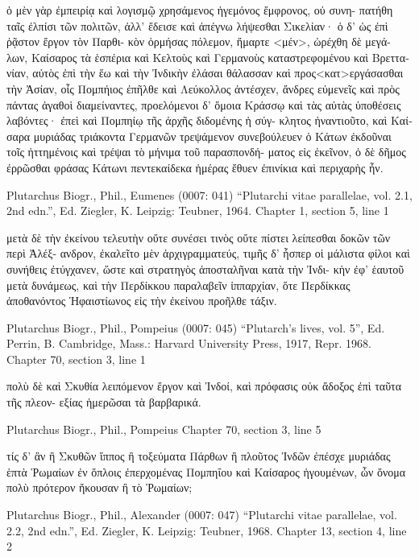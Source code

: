 \documentclass[12pt,letterpaper,twoside,final]{memoir}
\begin{document}
\begin{greek}
                                                ὁ μὲν γὰρ ἐμπειρίᾳ 
καὶ λογισμῷ χρησάμενος ἡγεμόνος ἔμφρονος, οὐ συνη-
πατήθη ταῖς ἐλπίσι τῶν πολιτῶν, ἀλλ' ἔδεισε καὶ ἀπέγνω 
λήψεσθαι Σικελίαν· ὁ δ' ὡς ἐπὶ ῥᾷστον ἔργον τὸν Παρθι-
κὸν ὁρμήσας πόλεμον, ἥμαρτε <μέν>, ὠρέχθη δὲ μεγά-
λων, Καίσαρος τὰ ἑσπέρια καὶ Κελτοὺς καὶ Γερμανοὺς 
καταστρεφομένου καὶ Βρεττανίαν, αὐτὸς ἐπὶ τὴν ἕω καὶ 
τὴν Ἰνδικὴν ἐλάσαι θάλασσαν καὶ προς<κατ>εργάσασθαι 
τὴν Ἀσίαν, οἷς Πομπήιος ἐπῆλθε καὶ Λεύκολλος ἀντέσχεν, 
ἄνδρες εὐμενεῖς καὶ πρὸς πάντας ἀγαθοὶ διαμείναντες, 
προελόμενοι δ' ὅμοια Κράσσῳ καὶ τὰς αὐτὰς ὑποθέσεις 
λαβόντες· ἐπεὶ καὶ Πομπηίῳ τῆς ἀρχῆς διδομένης ἡ σύγ-
κλητος ἠναντιοῦτο, καὶ Καίσαρα μυριάδας τριάκοντα 
Γερμανῶν τρεψάμενον συνεβούλευεν ὁ Κάτων ἐκδοῦναι 
τοῖς ἡττημένοις καὶ τρέψαι τὸ μήνιμα τοῦ παρασπονδή-
ματος εἰς ἐκεῖνον, ὁ δὲ δῆμος ἐρρῶσθαι φράσας Κάτωνι 
πεντεκαίδεκα ἡμέρας ἔθυεν ἐπινίκια καὶ περιχαρὴς ἦν. 



Plutarchus Biogr., Phil., Eumenes (0007: 041)
“Plutarchi vitae parallelae, vol. 2.1, 2nd edn.”, Ed. Ziegler, K.
Leipzig: Teubner, 1964.
Chapter 1, section 5, line 1

                                                            μετὰ δὲ τὴν ἐκείνου 
τελευτὴν οὔτε συνέσει τινὸς οὔτε πίστει λείπεσθαι δοκῶν τῶν περὶ Ἀλέξ-
ανδρον, ἐκαλεῖτο μὲν ἀρχιγραμματεύς, τιμῆς δ' ἧσπερ οἱ μάλιστα φίλοι 
καὶ συνήθεις ἐτύγχανεν, ὥστε καὶ στρατηγὸς ἀποσταλῆναι κατὰ τὴν Ἰνδι-
κὴν ἐφ' ἑαυτοῦ μετὰ δυνάμεως, καὶ τὴν Περδίκκου παραλαβεῖν ἱππαρχίαν, 
ὅτε Περδίκκας ἀποθανόντος Ἡφαιστίωνος εἰς τὴν ἐκείνου προῆλθε τάξιν. 



Plutarchus Biogr., Phil., Pompeius (0007: 045)
“Plutarch's lives, vol. 5”, Ed. Perrin, B.
Cambridge, Mass.: Harvard University Press, 1917, Repr. 1968.
Chapter 70, section 3, line 1

πολὺ δὲ καὶ Σκυθία λειπόμενον ἔργον καὶ Ἰνδοί, 
καὶ πρόφασις οὐκ ἄδοξος ἐπὶ ταῦτα τῆς πλεον-
εξίας ἡμερῶσαι τὰ βαρβαρικά. 



Plutarchus Biogr., Phil., Pompeius 
Chapter 70, section 3, line 5

                                  τίς δ' ἂν ἢ 
Σκυθῶν ἵππος ἢ τοξεύματα Πάρθων ἢ πλοῦτος 
Ἰνδῶν ἐπέσχε μυριάδας ἑπτὰ Ῥωμαίων ἐν ὅπλοις 
ἐπερχομένας Πομπηΐου καὶ Καίσαρος ἡγουμένων, 
ὧν ὄνομα πολὺ πρότερον ἤκουσαν ἢ τὸ Ῥωμαίων; 



Plutarchus Biogr., Phil., Alexander (0007: 047)
“Plutarchi vitae parallelae, vol. 2.2, 2nd edn.”, Ed. Ziegler, K.
Leipzig: Teubner, 1968.
Chapter 13, section 4, line 2


\end{greek}
\end{document}
